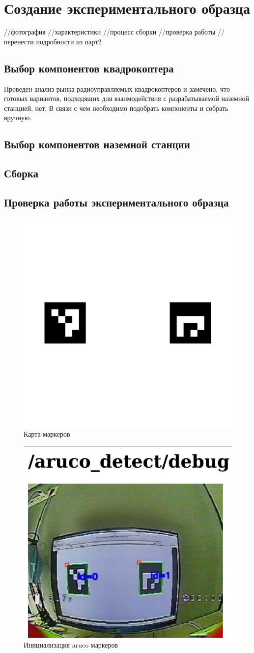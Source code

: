 
\section{Создание экспериментального образца}
//фотография
//характеристики
//процесс сборки
//проверка работы
//перенести подробности из парт2
\subsection{Выбор компонентов квадрокоптера}
Проведен анализ рынка радиоуправляемых квадрокоптеров и замечено, что готовых вариантов, подходящих для взаимодействия с разрабатываемой наземной станцией, нет. В связи с чем необходимо подобрать компоненты и собрать вручную.

\subsection{Выбор компонентов наземной станции}
\subsection{Сборка}
\subsection{Проверка работы экспериментального образца}
\begin{figure}[H]
	\centering
	\includegraphics[width=0.5\linewidth]{pics/map}
	\caption{Карта маркеров
	}
	\label{fig:map}
\end{figure}

\begin{figure}[H]
	\centering
	\includegraphics[width=0.5\linewidth]{pics/aruco_detect}
	\caption{Инициализация aruco маркеров
	}
	\label{fig:aruco_detect}
\end{figure}

